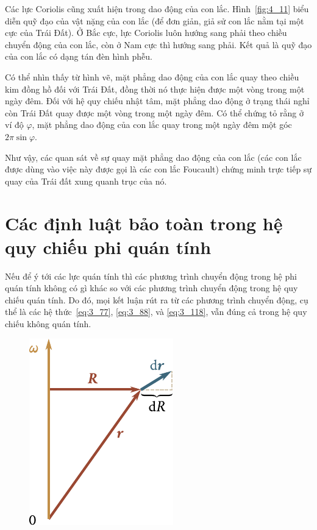 Các lực Coriolis cũng xuất hiện trong dao động của con lắc. Hình~\ref{fig:4_11} biểu diễn quỹ đạo của vật nặng của con lắc (để đơn giản, giả sử con lắc nằm tại một cực của Trái Đất). Ở Bắc cực, lực Coriolis luôn hướng sang phải theo chiều chuyển động của con lắc, còn ở Nam cực thì hướng sang phải. Kết quả là quỹ đạo của con lắc có dạng tán đèn hình phễu.

Có thể nhìn thấy từ hình vẽ, mặt phẳng dao động của con lắc quay theo chiều kim đồng hồ đối với Trái Đất, đồng thời nó thực hiện được một vòng trong một ngày đêm. Đối với hệ quy chiếu nhật tâm, mặt phẳng dao động ở trạng thái nghỉ còn Trái Đất quay được một vòng trong một ngày đêm. Có thể chứng tỏ rằng ở ví độ $\varphi$, mặt phẳng dao động của con lắc quay trong một ngày đêm một góc $2\pi\sin\varphi$.

Như vậy, các quan sát về sự quay mặt phẳng dao động của con lắc (các con lắc được dùng vào việc này được gọi là các con lắc Foucault) chứng minh trực tiếp sự quay của Trái đất xung quanh trục của nó.

\section{Các định luật bảo toàn trong hệ quy chiếu phi quán tính}\label{sec:4_4}

Nếu để ý tới các lực quán tính thì các phương trình chuyển động trong hệ phi quán tính không có gì khác so với các phương trình chuyển động trong hệ quy chiếu quán tính. Do đó, mọi kết luận rút ra từ các phương trình chuyển động, cụ thể là các hệ thức~\eqref{eq:3_77}, \eqref{eq:3_88}, và \eqref{eq:3_118}, vẫn đúng cả trong hệ quy chiếu không quán tính.

\begin{figure}[!htb]
	\begin{center}
		\includegraphics[scale=1]{figures/ch_04/fig_4_12.pdf}
		\caption[]{}
		\label{fig:4_12}
	\end{center}
\end{figure}


